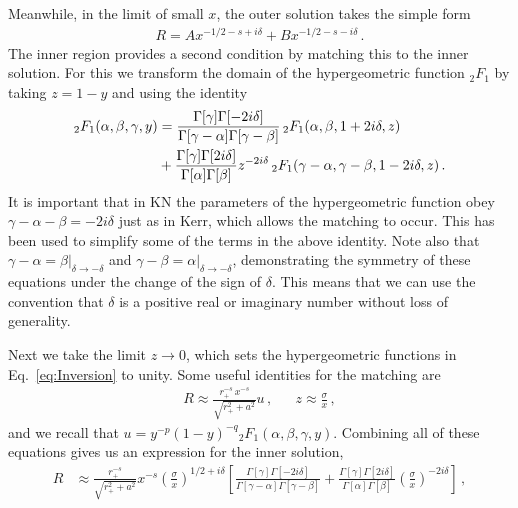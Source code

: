 \begin{refsection}
Meanwhile, in the limit of small $x$, the outer solution takes the simple form
\begin{align}
R = A x^{-1/2 - s + i \delta} + B x^{-1/2 -s - i \delta} \,.
\end{align}
The inner region provides a second condition by matching this to the inner solution. For this we transform the domain of the hypergeometric function  ${}_2 F_1$ by taking $z = 1-y$ and using the identity~\cite{nist}
\begin{align}
\label{eq:Inversion}
{}_2 F_1( \alpha, \beta, \gamma, y) & = \frac{\Gamma[\gamma] \Gamma[-2 i \delta]}{\Gamma[\gamma- \alpha]\Gamma[\gamma-\beta]} \,{}_2 F_1(\alpha, \beta, 1+ 2 i \delta, z) \notag \\
&+ \frac{\Gamma[\gamma]\Gamma[2 i \delta]}{\Gamma[\alpha]\Gamma[\beta]} z^{-2 i \delta} \,{}_2 F_1(\gamma - \alpha, \gamma -\beta, 1 -2 i \delta, z) \,.
\end{align}
It is important that in KN the parameters of the hypergeometric function obey $\gamma - \alpha - \beta = - 2 i \delta$ just as in Kerr, which allows the matching to occur. This has been used to simplify some of the terms in the above identity.
Note also that $\gamma - \alpha  = \beta|_{\delta \to -\delta}$ and $ \gamma - \beta = \alpha|_{\delta \to -\delta}$, demonstrating the symmetry of these equations under the change of the sign of $\delta$. 
This means that we can use the convention that $\delta$ is a positive real or imaginary number without loss of generality.

Next we take the limit $z \to 0$, which sets the hypergeometric functions in Eq.~\eqref{eq:Inversion} to unity.
Some useful identities for the matching are
\begin{align}
R  \approx \frac{r_+^{-s} \, x^{-s}}{\sqrt{r_+^2 +a^2}} u \,, && z \approx \frac{\sigma}{x} \,,
\end{align}
and we recall that $u = y^{-p} (1-y)^{-q} {}_2 F_1(\alpha, \beta, \gamma, y)$. 
Combining all of these equations gives us an expression for the inner solution,
\begin{align}
\label{eq:innmatch}
R & \approx \frac{r_+^{-s}}{\sqrt{r_+^2 +a^2}} x^{-s} \left(\frac{\sigma}{x} \right)^{1/2+i\delta} \left [\frac{\Gamma[\gamma] \Gamma[-2 i \delta]}{\Gamma[\gamma- \alpha]\Gamma[\gamma-\beta]} + \frac{\Gamma[\gamma]\Gamma[2 i \delta]}{\Gamma[\alpha]\Gamma[\beta]}\left( \frac{\sigma}{x}\right)^{-2 i \delta} \right] \,,
\end{align}



\end{refsection}

